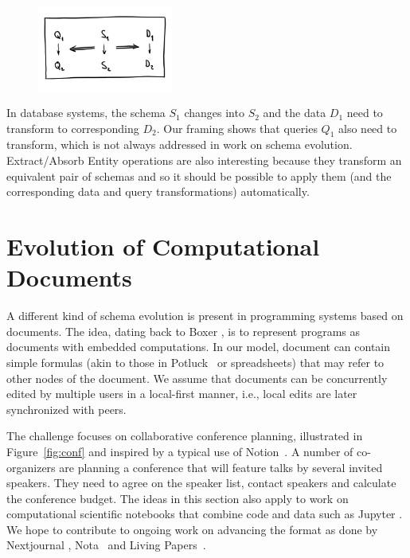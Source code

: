 \documentclass[english,submission]{programming}
\DeclareRobustCommand{\frameworkbox}[1]{\leftbar#1\endleftbar}
\newcommand{\frameworkboxtitle}[1]{\noindent{\firamedium #1.}\quad}
\begin{document}
\frameworkbox{
\begin{figure}
\vspace{-0.5em}
\includegraphics[width=12em]{figures/arr-db.png}
\vspace{-1em}
\end{figure}
\frameworkboxtitle{Equivalence in Schema Evolution}
In database systems, the schema
$S_1$ changes into $S_2$ and the data $D_1$ need to transform to corresponding $D_2$.
Our framing shows that queries $Q_1$ also need to transform, which is not always addressed
in work on schema evolution. Extract/Absorb Entity operations are also interesting because
they transform an equivalent pair of schemas and so it should be possible to apply them
(and the corresponding data and query transformations) automatically.
}


\section{Evolution of Computational Documents}
A different kind of schema evolution is present in programming systems based on documents.
The idea, dating back to Boxer \cite{diSessa86}, is to represent programs as documents
with embedded computations. In our model, document can contain simple formulas (akin to those
in Potluck~\cite{Litt2023} or spreadsheets) that may refer to other nodes of the document.
We assume that documents can be concurrently edited by multiple users in a local-first manner,
i.e., local edits are later synchronized with peers.

The challenge focuses on collaborative conference planning, illustrated in Figure~\ref{fig:conf}
and inspired by a typical use of Notion~\cite{notion}. A number of co-organizers are planning
a conference that will feature talks by several invited speakers. They need to agree on the
speaker list, contact speakers and calculate the conference budget.
%
The ideas in this section also apply to work on computational scientific notebooks
that combine code and data such as Jupyter \cite{Kluyver2016}. We hope to contribute to ongoing
work on advancing the format as done by Nextjournal \cite{Nextjournal21}, Nota~\cite{Crichton2021}
and Living Papers~\cite{Heer2023}.
\end{document}

